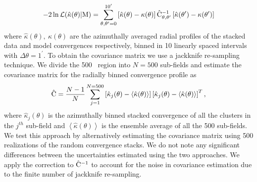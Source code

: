 \begin{equation}
-2\ln\mathcal{L (\hat{\kappa}(\theta)| \rm{M}}) = 
\sum_{\theta, \theta^{\prime} = 0}^{10^{\prime}}\left[\hat{\kappa}(\theta) - \kappa(\theta)\right] \hat{{\rm C}}_{\theta, \theta^{\prime}}^{-1} \left[\hat{\kappa}(\theta^{\prime}) - \kappa(\theta^{\prime})\right]
\label{eq_QE_likelihood}
\end{equation}
where $\hat{\kappa}(\theta),\ \kappa(\theta)$ are the azimuthally averaged radial profiles of the stacked data and model convergences respectively, binned in 10 linearly spaced intervals with $\Delta\theta = 1^{\prime}$. %
To obtain the covariance matrix we use a jackknife re-sampling technique. We divide the \sptpol{} 500 \sqdeg\ region into $N=500$ sub-fields and estimate the covariance matrix for the radially binned convergence profile as 
\begin{equation}
\hat{{\rm C}} = \frac{N-1}{N} \sum\limits_{j=1}^{N = 500} \left[\hat{\kappa}_{j}(\theta) - \left<\hat{\kappa}(\theta)\right>\right] \left[\hat{\kappa}_{j}(\theta) - \left<\hat{\kappa}(\theta)\right>\right]^{T},
\label{eq_JK_cov}
\end{equation}
where $\hat{\kappa}_{j}(\theta)$ is the azimuthally binned stacked convergence of all the clusters in the $j^{th}$ sub-field and  $\left<\hat{\kappa}(\theta)\right>$ is the ensemble average of all the 500 sub-fields.
We test this approach by alternatively estimating the covariance matrix using 500 realizations of the random convergence stacks. 
We do not note any significant differences between the uncertainties estimated using the two approaches. 
We apply the \citet{hartlap06} correction to $\hat{{\rm C}}^{-1}$ to account for the noise in covariance estimation due to the finite number of jackknife re-sampling.


